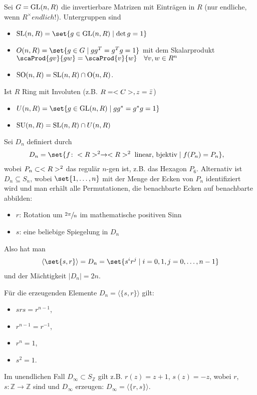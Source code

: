 \begin{example}
	Sei $G = \operatorname{GL}(n,R)$ die invertierbare Matrizen mit Einträgen in $R$ (nur endliche, wenn $R^{\times} endlich$!). Untergruppen sind
	\begin{itemize}
		\item $\SL(n,R) = \set{g \in \GL(n,R) \mid \det g = 1}$
		\item $O(n,R) = \set{g \in G \mid gg^T = g^T g = 1}$ mit dem Skalarprodukt $\scaProd{gv}{gw} = \scaProd{v}{w} \quad \forall v,w \in R^n$
		\item $\operatorname{SO}(n,R) = \mathrm{SL}(n, R) \cap \mathrm O(n,R)$.
	\end{itemize}
	Ist $R$ Ring mit Involuten (z.B. $R = <C>, z = \bar{z}$)
	\begin{itemize}
		\item $U(n,R) = \set{g \in \GL(n,R) \mid gg^{*} = g^{*}g = 1}$
		\item $\operatorname{SU}(n,R) = \operatorname{SL}(n,R) \cap U(n,R)$
	\end{itemize}
\end{example}

\begin{example}
	Sei $D_n$ definiert durch\begin{align*}
		D_n &= \set{f\colon \R^2 \to \R^2 \; \text{linear, bjektiv} \mid f(P_n) = P_n},
	\end{align*}
	wobei $P_n \subset <R>^2$ das regulär $n$-gen ist, z.B. das Hexagon $P_6$. %
	Alternativ ist $D_n \subseteq S_n$, wobei $\set{1, \dots,n}$ mit der Menge der Ecken von $P_n$ identifiziert wird und man erhält alle Permutationen, die benachbarte Ecken auf benachbarte abbilden:
	\begin{itemize}
		\item $r$: Rotation um $\sfrac{2\pi}{n}$ im mathematische positiven Sinn
		\item $s$: eine beliebige Spiegelung in $D_n$
	\end{itemize}
	Also hat man
	\begin{align*}
		\langle \set{s,r}\rangle = D_n = \set{s^i r^j \mid i = 0,1, j=0, \dots, n-1}
	\end{align*}
	und der Mächtigkeit $\vert D_n\vert = 2n$.
	
	Für die erzeugenden Elemente $D_n = \langle \lbrace s,r\rbrace \rangle$ gilt:
	\begin{itemize}
		\item $srs = r^{n-1}$,
		\item $r^{n-1} = r^{-1}$,
		\item $r^n = 1$,
		\item $s^2 = 1$.
	\end{itemize}
Im unendlichen Fall $D_\infty \subset S_{\mathbb Z}$ gilt z.B. $r(z) = z+1$, $s(z) = -z$, wobei $r$, $s\colon \mathbb Z\to\mathbb Z$ sind und $D_\infty$ erzeugen: $D_\infty = \langle \lbrace r,s\rbrace\rangle$.
\end{example}

